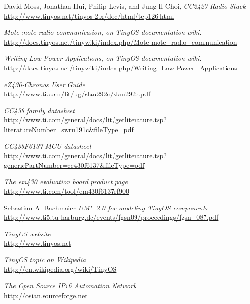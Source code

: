 \begin{thebibliography}{99}
  David Moss, Jonathan Hui, Philip Levis, and Jung Il Choi,
  \textit{CC2420 Radio Stack} \\
  \url{http://www.tinyos.net/tinyos-2.x/doc/html/tep126.html}

  \textit{Mote-mote radio communication, on TinyOS documentation wiki.} \\
  \url{http://docs.tinyos.net/tinywiki/index.php/Mote-mote_radio_communication}

  \textit{Writing Low-Power Applications, on TinyOS documentation wiki.} \\
  \url{http://docs.tinyos.net/tinywiki/index.php/Writing_Low-Power_Applications}

  \textit{eZ430-Chronos User Guide} \\
  \url{http://www.ti.com/lit/ug/slau292c/slau292c.pdf}

  \textit{CC430 family datasheet}\\
  \url{http://www.ti.com/general/docs/lit/getliterature.tsp?literatureNumber=swru191c&fileType=pdf}

  \textit{CC430F6137 MCU datasheet} \\
  \url{http://www.ti.com/general/docs/lit/getliterature.tsp?genericPartNumber=cc430f6137&fileType=pdf}

  \textit{The em430 evaluation board product page} \\
  \url{http://www.ti.com/tool/em430f6137rf900}

  Sebastian A. Bachmaier
  \textit{UML 2.0 for modeling TinyOS components} \\
  \url{http://www.ti5.tu-harburg.de/events/fgsn09/proceedings/fgsn_087.pdf}

  \textit{TinyOS website} \\
  \url{http://www.tinyos.net}

  \textit{TinyOS topic on Wikipedia} \\
  \url{http://en.wikipedia.org/wiki/TinyOS}

  \textit{The Open Source IPv6 Automation Network} \\
  \url{http://osian.sourceforge.net}


\end{thebibliography}
